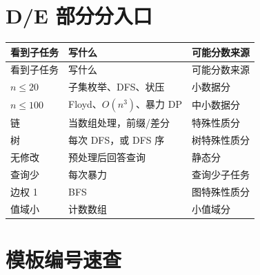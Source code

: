 \section{D/E 部分分入口}\label{sec:02-8}

\begin{longtable}{p{4.0cm}p{5.4cm}p{4.6cm}}
\toprule
看到子任务 & 写什么 & 可能分数来源 \\
\midrule
\endfirsthead
\toprule
看到子任务 & 写什么 & 可能分数来源 \\
\midrule
\endhead
$n \le 20$ & 子集枚举、DFS、状压 & 小数据分 \\
$n \le 100$ & Floyd、$O(n^3)$、暴力 DP & 中小数据分 \\
链 & 当数组处理，前缀/差分 & 特殊性质分 \\
树 & 每次 DFS，或 DFS 序 & 树特殊性质分 \\
无修改 & 预处理后回答查询 & 静态分 \\
查询少 & 每次暴力 & 查询少子任务 \\
边权 1 & BFS & 图特殊性质分 \\
值域小 & 计数数组 & 小值域分 \\
\bottomrule
\end{longtable}

\section{模板编号速查}\label{sec:02-9}

